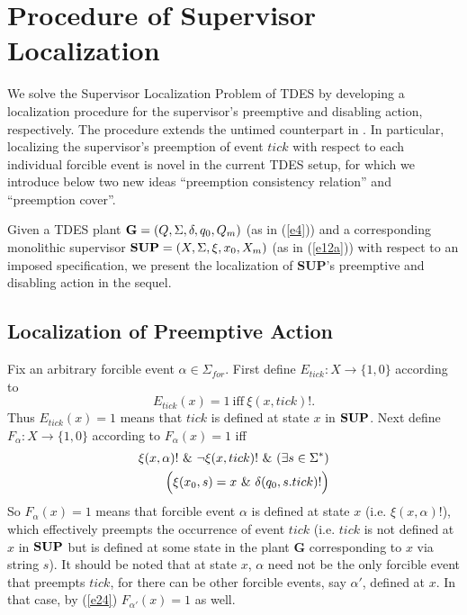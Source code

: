 \documentclass[twocolumn]{autart}
\begin{document}
\section{Procedure of Supervisor Localization} \label{sec:4}

We solve the Supervisor Localization Problem of TDES by developing a
localization procedure for the supervisor's preemptive and disabling
action, respectively. The procedure extends the untimed counterpart
in \cite{CaiWonham:2010a}. In particular, localizing the
supervisor's preemption of event $tick$ with respect to each
individual forcible event is novel in the current TDES setup,
for which we introduce below two new ideas ``preemption
consistency relation'' and ``preemption cover''.

Given a TDES plant ${\bf G} = (Q, \Sigma, \delta, q_0, Q_m)$ (as in
(\ref{e4})) and a corresponding monolithic supervisor ${\bf SUP} =
(X, \Sigma, \xi, x_0, X_m)$ (as in (\ref{e12a})) with respect to an
imposed specification, we present the localization of {\bf SUP}'s
preemptive and disabling action in the sequel.

\subsection{Localization of Preemptive Action} \label{sec:4.1}

Fix an arbitrary forcible event $\alpha \in \Sigma_{for}$.
First define $E_{tick}: X \rightarrow \{1,0\}$ according to
\begin{equation}\label{e23}
E_{tick}(x) = 1~\text{iff}~\xi(x,tick)!.
\end{equation}
Thus $E_{tick}(x) = 1$ means that $tick$ is defined at
state $x$ in $\bf SUP$. Next define $F_\alpha:X \rightarrow \{1,0\}$
according to $F_\alpha(x) = 1$ iff
\begin{align} \label{e24}
\xi(x,\alpha)! ~\&~ \neg\xi(x,tick)! ~\&~  (\exists s\in
\Sigma^*) \notag\\
\Big( \xi(x_0,s)=x ~\&~\delta(q_0, s.tick)! \Big)
\end{align}
So $F_\alpha(x) = 1$ means that forcible event $\alpha$ is defined
at state $x$ (i.e. $\xi(x,\alpha)!$), which effectively preempts the
occurrence of event $tick$ (i.e. $tick$ is not defined at $x$ in
$\bf SUP$ but is defined at some state in the plant $\textbf{G}$
corresponding to $x$ via string $s$). It should be noted that at
state $x$, $\alpha$ need not be the only forcible event that
preempts $tick$, for there can be other forcible events, say
$\alpha'$, defined at $x$.  In that case, by (\ref{e24})
$F_{\alpha'}(x) = 1$ as well.
\end{document}
